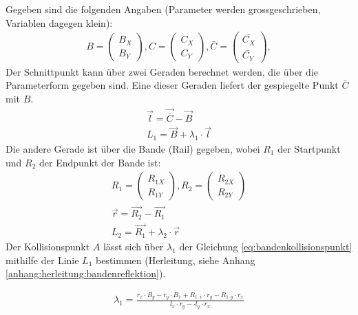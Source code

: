 Gegeben sind die folgenden Angaben (Parameter werden grossgeschrieben, Variablen dagegen klein):
\begin{align}
    B = \begin{pmatrix}B_X\\B_Y\end{pmatrix},
    C = \begin{pmatrix}C_X\\C_Y\end{pmatrix},
    \bar{C} = \begin{pmatrix}\bar{C_X}\\\bar{C_Y}\end{pmatrix},
\end{align}
Der Schnittpunkt kann über zwei Geraden berechnet werden, die über die Parameterform gegeben sind.
Eine dieser Geraden liefert der gespiegelte Punkt $\bar{C}$ mit $B$.
\begin{align}
    \vec{l} = \vec{\bar{C}} - \vec{B}\\
    L_1 = \vec{B} + \lambda_1 \cdot \vec{l}
\end{align}
Die andere Gerade ist über die Bande (Rail) gegeben, wobei $R_1$ der Startpunkt und $R_2$ der Endpunkt der Bande ist:
\begin{align}
    R_1 = \begin{pmatrix}R_{1X}\\R_{1Y}\end{pmatrix}, R_2 = \begin{pmatrix}R_{2X}\\R_{2Y}\end{pmatrix}\\
    \vec{r} = \vec{R_2} - \vec{R_1}\\
    L_2 = \vec{R_1} + \lambda_2 \cdot \vec{r}
\end{align}
Der Kollisionspunkt $A$ lässt sich über $\lambda_1$ der Gleichung \ref{eq:bandenkollisionspunkt} mithilfe der Linie $L_1$
bestimmen (Herleitung, siehe Anhang \ref{anhang:herleitung:bandenreflektion}).

\begin{align}
    \lambda_1 = \frac{r_x \cdot B_y - r_y \cdot B_x + R_{1,x} \cdot r_y - R_{1,y} \cdot r_x}{l_x \cdot r_y - \cdot l_y \cdot r_x}\label{eq:bandenkollisionspunkt}
\end{align}

